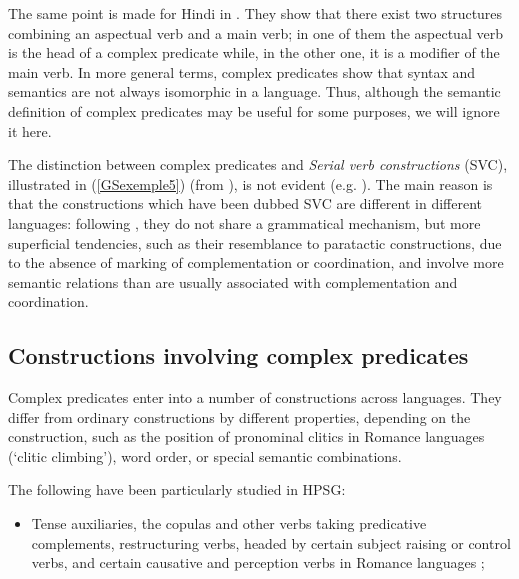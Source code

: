\documentclass[output=paper
                ,modfonts
                ,nonflat
	        ,collection
	        ,collectionchapter
	        ,collectiontoclongg
 	        ,biblatex
                ,babelshorthands
                ,newtxmath
                ,draftmode
                ,colorlinks, citecolor=brown
]{./langsci/langscibook}
\begin{document}
{	\label{GSexemple4b} 
\zl

The same point is made for Hindi in \cite{poornima2009hindi}. They show that there exist two structures combining an aspectual verb and a main verb; in one of them the aspectual verb is the head of a complex predicate while, in the other one, it is a modifier of the main verb. In more general terms, complex predicates show that syntax and semantics are not always isomorphic in a language. Thus, although the semantic definition of complex predicates may be useful for some purposes, we will ignore it here.

The distinction between complex predicates and \emph{Serial verb constructions} (SVC), illustrated in (\ref{GSexemple5}) (from \citealt{MH2016}), is not evident (e.g. \citealt{andrews1999complex, MH2016}). The main reason is that the constructions which have been dubbed SVC are different in different languages: following \cite{andrews1999complex}, they do not share a grammatical mechanism, but more superficial tendencies, such as their resemblance to paratactic constructions, due to the absence of marking of complementation or coordination, and involve more semantic relations than are usually associated with complementation and coordination.

\z

\subsection{Constructions involving complex predicates}\label{GSsection1.2}

Complex predicates enter into a number of constructions across languages. They differ from ordinary constructions by different properties, depending on the construction, such as the position of pronominal clitics in Romance languages (`clitic climbing'), word order, or special semantic combinations. 

The following have been particularly studied in HPSG:

\begin{itemize}
	
	\item Tense auxiliaries, the copulas and other verbs taking predicative complements, restructuring verbs, headed by certain subject raising or control verbs, and certain causative and perception verbs in Romance languages \citep{abeille1994complementation, abeille2000french, abeille2001deux, abeille2001varieties, AG2002b-u, AG2010, abeille1995doublestructure, AGMS98a, AGS1998, Monachesi98a};
	

\end{itemize}}
\end{document}
